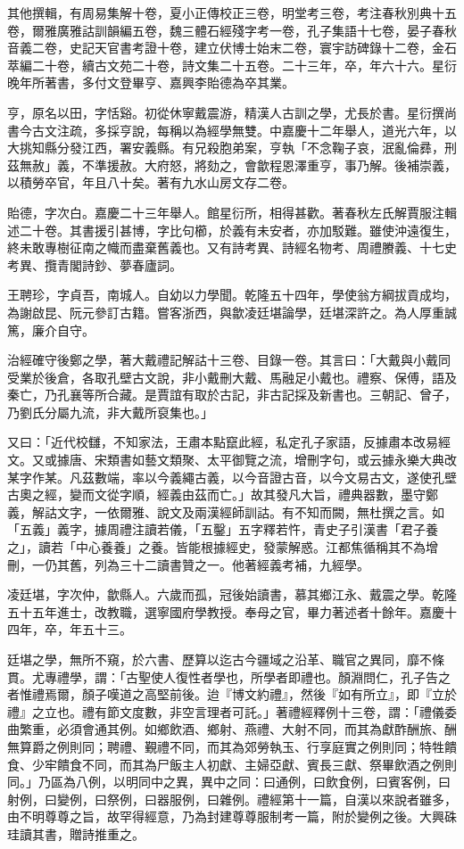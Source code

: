 \begin{pinyinscope}
其他撰輯，有周易集解十卷，夏小正傳校正三卷，明堂考三卷，考注春秋別典十五卷，爾雅廣雅詁訓韻編五卷，魏三體石經殘字考一卷，孔子集語十七卷，晏子春秋音義二卷，史記天官書考證十卷，建立伏博士始末二卷，寰宇訪碑錄十二卷，金石萃編二十卷，續古文苑二十卷，詩文集二十五卷。二十三年，卒，年六十六。星衍晚年所著書，多付文登畢亨、嘉興李貽德為卒其業。

亨，原名以田，字恬谿。初從休寧戴震游，精漢人古訓之學，尤長於書。星衍撰尚書今古文注疏，多採亨說，每稱以為經學無雙。中嘉慶十二年舉人，道光六年，以大挑知縣分發江西，署安義縣。有兄殺胞弟案，亨執「不念鞠子哀，泯亂倫彞，刑茲無赦」義，不準援赦。大府怒，將劾之，會歙程恩澤重亨，事乃解。後補崇義，以積勞卒官，年且八十矣。著有九水山房文存二卷。

貽德，字次白。嘉慶二十三年舉人。館星衍所，相得甚歡。著春秋左氏解賈服注輯述二十卷。其書援引甚博，字比句櫛，於義有未安者，亦加駁難。雖使沖遠復生，終未敢專樹征南之幟而盡棄舊義也。又有詩考異、詩經名物考、周禮賸義、十七史考異、攬青閣詩鈔、夢春廬詞。

王聘珍，字貞吾，南城人。自幼以力學聞。乾隆五十四年，學使翁方綱拔貢成均，為謝啟昆、阮元參訂古籍。嘗客浙西，與歙凌廷堪論學，廷堪深許之。為人厚重誠篤，廉介自守。

治經確守後鄭之學，著大戴禮記解詁十三卷、目錄一卷。其言曰：「大戴與小戴同受業於後倉，各取孔壁古文說，非小戴刪大戴、馬融足小戴也。禮察、保傅，語及秦亡，乃孔襄等所合藏。是賈誼有取於古記，非古記採及新書也。三朝記、曾子，乃劉氏分屬九流，非大戴所裒集也。」

又曰：「近代校讎，不知家法，王肅本點竄此經，私定孔子家語，反據肅本改易經文。又或據唐、宋類書如藝文類聚、太平御覽之流，增刪字句，或云據永樂大典改某字作某。凡茲數端，率以今義繩古義，以今音證古音，以今文易古文，遂使孔壁古奧之經，變而文從字順，經義由茲而亡。」故其發凡大旨，禮典器數，墨守鄭義，解詁文字，一依爾雅、說文及兩漢經師訓詁。有不知而闕，無杜撰之言。如「五義」義字，據周禮注讀若儀，「五鑿」五字釋若忤，青史子引漢書「君子養之」，讀若「中心養養」之養。皆能根據經史，發蒙解惑。江都焦循稱其不為增刪，一仍其舊，列為三十二讀書贊之一。他著經義考補，九經學。

凌廷堪，字次仲，歙縣人。六歲而孤，冠後始讀書，慕其鄉江永、戴震之學。乾隆五十五年進士，改教職，選寧國府學教授。奉母之官，畢力著述者十餘年。嘉慶十四年，卒，年五十三。

廷堪之學，無所不窺，於六書、歷算以迄古今疆域之沿革、職官之異同，靡不條貫。尤專禮學，謂：「古聖使人復性者學也，所學者即禮也。顏淵問仁，孔子告之者惟禮焉爾，顏子嘆道之高堅前後。迨『博文約禮』，然後『如有所立』，即『立於禮』之立也。禮有節文度數，非空言理者可託。」著禮經釋例十三卷，謂：「禮儀委曲繁重，必須會通其例。如鄉飲酒、鄉射、燕禮、大射不同，而其為獻酢酬旅、酬無算爵之例則同；聘禮、覲禮不同，而其為郊勞執玉、行享庭實之例則同；特牲饋食、少牢饋食不同，而其為尸飯主人初獻、主婦亞獻、賓長三獻、祭畢飲酒之例則同。」乃區為八例，以明同中之異，異中之同：曰通例，曰飲食例，曰賓客例，曰射例，曰變例，曰祭例，曰器服例，曰雜例。禮經第十一篇，自漢以來說者雖多，由不明尊尊之旨，故罕得經意，乃為封建尊尊服制考一篇，附於變例之後。大興硃珪讀其書，贈詩推重之。


\end{pinyinscope}
